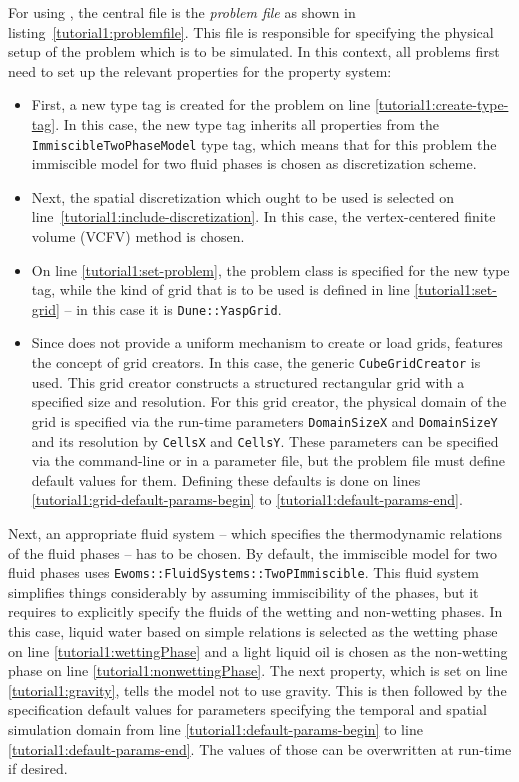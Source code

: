 For using \eWoms, the central file is the \textit{problem file} as
shown in listing~\ref{tutorial1:problemfile}. This file is responsible
for specifying the physical setup of the problem which is to be
simulated. In this context, all problems first need to set up the
relevant properties for the \eWoms property system:
\begin{itemize}
\item First, a new type tag is created for the problem on line
  \ref{tutorial1:create-type-tag}.  In this case, the new type
  tag inherits all properties from the \texttt{ImmiscibleTwoPhaseModel}
  type tag, which means that for this problem the immiscible model
  for two fluid phases is chosen as discretization scheme.
\item Next, the spatial discretization which ought to be used is
  selected on line~\ref{tutorial1:include-discretization}. In this
  case, the vertex-centered finite volume (VCFV) method is chosen.
\item On line \ref{tutorial1:set-problem}, the problem class is
  specified for the new type tag, while the kind of grid that is to be
  used is defined in line \ref{tutorial1:set-grid} -- in this case
  it is \texttt{Dune::YaspGrid}.
\item Since \Dune does not provide a uniform mechanism to create or
  load grids, \eWoms features the concept of grid creators. In this
  case, the generic \texttt{CubeGridCreator} is used. This grid
  creator constructs a structured rectangular grid with a specified
  size and resolution. For this grid creator, the physical domain of
  the grid is specified via the run-time parameters
  \texttt{DomainSizeX} and \texttt{DomainSizeY} and its resolution by
  \texttt{CellsX} and \texttt{CellsY}. These parameters can be
  specified via the command-line or in a parameter file, but the
  problem file must define default values for them. Defining these
  defaults is done on lines \ref{tutorial1:grid-default-params-begin}
  to \ref{tutorial1:default-params-end}.
\end{itemize}

Next, an appropriate fluid system -- which specifies the thermodynamic
relations of the fluid phases -- has to be chosen. By default, the
immiscible model for two fluid phases uses
\texttt{\justifyNoHyphen{}Ewoms::Fluid\-Systems::TwoPImmiscible}. This
fluid system simplifies things considerably by assuming immiscibility
of the phases, but it requires to explicitly specify the fluids of the
wetting and non-wetting phases. In this case, liquid water based on
simple relations is selected as the wetting phase on line
\ref{tutorial1:wettingPhase} and a light liquid oil is chosen as the
non-wetting phase on line \ref{tutorial1:nonwettingPhase}. The next
property, which is set on line \ref{tutorial1:gravity}, tells the
model not to use gravity. This is then followed by the specification
default values for parameters specifying the temporal and spatial
simulation domain from line \ref{tutorial1:default-params-begin} to
line \ref{tutorial1:default-params-end}. The values of those can be
overwritten at run-time if desired.

